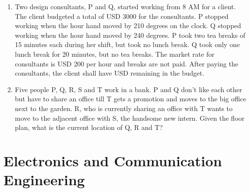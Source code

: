 \documentclass[a4paper, 11pt]{article}
\begin{document}
\begin{enumerate}
    \item Two design consultants, P and Q, started working from 8 AM for a client. The client budgeted a total of USD 3000 for the consultants. P stopped working when the hour hand moved by 210 degrees on the clock. Q stopped working when the hour hand moved by 240 degrees. P took two tea breaks of 15 minutes each during her shift, but took no lunch break. Q took only one lunch break for 20 minutes, but no tea breaks. The market rate for consultants is USD 200 per hour and breaks are not paid. After paying the consultants, the client shall have USD \underline{\hspace{2cm}} remaining in the budget.
    \begin{enumerate}
    \end{enumerate}
    \hfill{}

    \item Five people P, Q, R, S and T work in a bank. P and Q don't like each other but have to share an office till T gets a promotion and moves to the big office next to the garden. R, who is currently sharing an office with T wants to move to the adjacent office with S, the handsome new intern. Given the floor plan, what is the current location of Q, R and T? 
    \begin{enumerate}
    \end{enumerate}
    \hfill{}
\end{enumerate}

\section*{Electronics and Communication Engineering }
\end{document}
